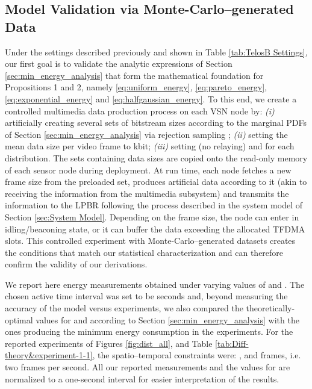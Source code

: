 \documentclass[twocolumn,english]{IEEEtran}
\theoremstyle{plain}
\theoremstyle{definition}
\begin{document}
\subsection{Model Validation via Monte-Carlo--generated Data }

\label{subsec:model_validation}

Under the settings described previously and shown in Table \ref{tab:TelosB Settings},
our first goal is to validate the analytic expressions of Section
\ref{sec:min_energy_analysis} that form the mathematical foundation
for Propositions 1 and 2, namely \eqref{eq:uniform_energy}, \eqref{eq:pareto_energy},
\eqref{eq:exponential_energy} and \eqref{eq:halfgaussian_energy}.
To this end, we create a controlled multimedia data production process
on each VSN node by: \emph{(i)} artificially creating several sets
of bitstream sizes according to the marginal PDFs of Section \ref{sec:min_energy_analysis}
via rejection sampling \cite{gilks1992adaptive}; \emph{(ii)} setting
the mean data size per video frame to  kbit; \emph{(iii)}
setting  (no relaying) and  for each distribution. The
sets containing data sizes are copied onto the read-only memory of
each sensor node during deployment. At run time, each node fetches
a new frame size from the preloaded set, produces artificial data
according to it (akin to receiving the information from the multimedia
subsystem) and transmits the information to the LPBR following the
process described in the system model of Section \ref{sec:System Model}.
Depending on the frame size, the node can enter in idling/beaconing
state, or it can buffer the data exceeding the allocated TFDMA slots.
This controlled experiment with Monte-Carlo--generated datasets creates
the conditions that match our statistical characterization and can
therefore confirm the validity of our derivations. 

We report here energy measurements obtained under varying values of
 and . The chosen active time interval was set to be 
seconds and, beyond measuring the accuracy of the model versus experiments,
we also compared the theoretically-optimal values for  and 
according to Section \ref{sec:min_energy_analysis} with the ones
producing the minimum energy consumption in the experiments. For the
reported experiments of Figures \ref{fig:dist_all}, and Table \ref{tab:Diff-theory&experiment-1-1},
the spatio--temporal constraints were: , 
and  frames, i.e. two frames per second. All our reported
measurements and the values for  are normalized to a one-second
interval for easier interpretation of the results.
\end{document}

